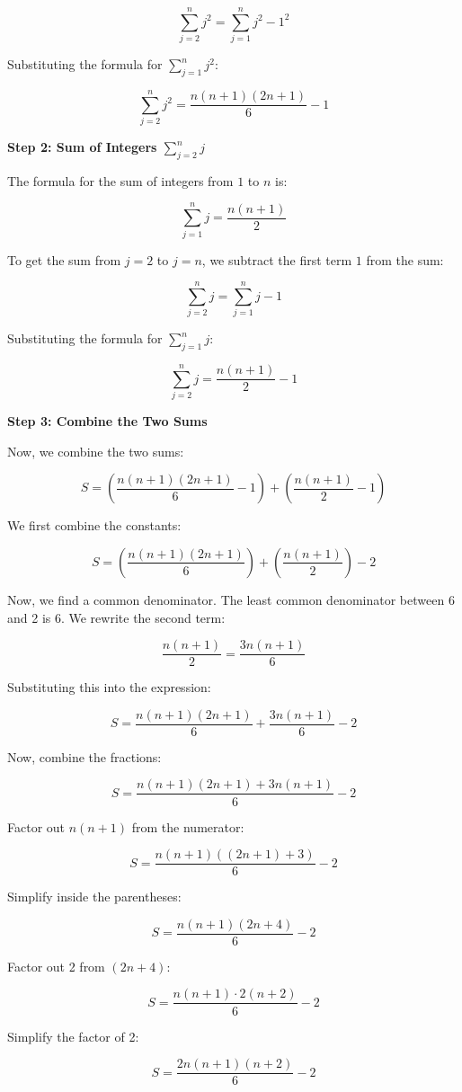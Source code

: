 \documentclass{article}
\begin{document}
\[
\sum_{j=2}^n j^2 = \sum_{j=1}^n j^2 - 1^2
\]

Substituting the formula for \( \sum_{j=1}^n j^2 \):

\[
\sum_{j=2}^n j^2 = \frac{n(n+1)(2n+1)}{6} - 1
\]

\textbf{Step 2: Sum of Integers \( \sum_{j=2}^n j \)}

The formula for the sum of integers from \(1\) to \(n\) is:

\[
\sum_{j=1}^n j = \frac{n(n+1)}{2}
\]

To get the sum from \(j = 2\) to \(j = n\), we subtract the first term \(1\) from the sum:

\[
\sum_{j=2}^n j = \sum_{j=1}^n j - 1
\]

Substituting the formula for \( \sum_{j=1}^n j \):

\[
\sum_{j=2}^n j = \frac{n(n+1)}{2} - 1
\]

\textbf{Step 3: Combine the Two Sums}

Now, we combine the two sums:

\[
S = \left( \frac{n(n+1)(2n+1)}{6} - 1 \right) + \left( \frac{n(n+1)}{2} - 1 \right)
\]

We first combine the constants:

\[
S = \left( \frac{n(n+1)(2n+1)}{6} \right) + \left( \frac{n(n+1)}{2} \right) - 2
\]

Now, we find a common denominator. The least common denominator between 6 and 2 is 6. We rewrite the second term:

\[
\frac{n(n+1)}{2} = \frac{3n(n+1)}{6}
\]

Substituting this into the expression:

\[
S = \frac{n(n+1)(2n+1)}{6} + \frac{3n(n+1)}{6} - 2
\]

Now, combine the fractions:

\[
S = \frac{n(n+1)(2n+1) + 3n(n+1)}{6} - 2
\]

Factor out \(n(n+1)\) from the numerator:

\[
S = \frac{n(n+1) \left( (2n+1) + 3 \right)}{6} - 2
\]

Simplify inside the parentheses:

\[
S = \frac{n(n+1)(2n+4)}{6} - 2
\]

Factor out 2 from \( (2n+4) \):

\[
S = \frac{n(n+1) \cdot 2( n+2)}{6} - 2
\]

Simplify the factor of 2:

\[
S = \frac{2n(n+1)(n+2)}{6} - 2
\]
\end{document}
